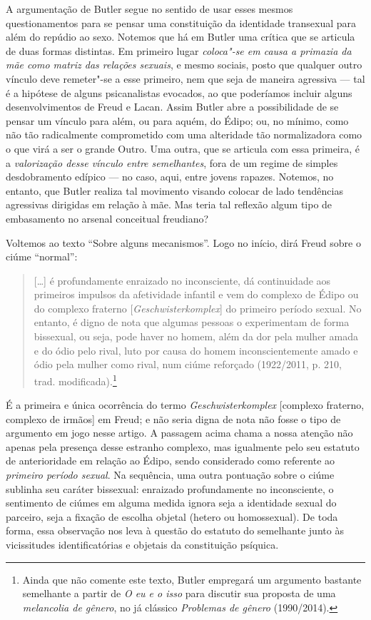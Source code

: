 A argumentação de Butler segue no sentido de usar esses mesmos
questionamentos para se pensar uma constituição da identidade transexual
para além do repúdio ao sexo. Notemos que há em Butler uma crítica que
se articula de duas formas distintas. Em primeiro lugar \emph{coloca"-se
em causa a primazia da mãe como matriz das relações sexuais}, e mesmo
sociais, posto que qualquer outro vínculo deve remeter"-se a esse
primeiro, nem que seja de maneira agressiva --- tal é a hipótese de
alguns psicanalistas evocados, ao que poderíamos incluir alguns
desenvolvimentos de Freud e Lacan. Assim Butler abre a possibilidade de
se pensar um vínculo para além, ou para aquém, do Édipo; ou, no mínimo,
como não tão radicalmente comprometido com uma alteridade tão
normalizadora como o que virá a ser o grande Outro. Uma outra, que se
articula com essa primeira, é a \emph{valorização desse vínculo entre
semelhantes}, fora de um regime de simples desdobramento edípico --- no
caso, aqui, entre jovens rapazes. Notemos, no entanto, que Butler
realiza tal movimento visando colocar de lado tendências agressivas
dirigidas em relação à mãe. Mas teria tal reflexão algum tipo de
embasamento no arsenal conceitual freudiano?

Voltemos ao texto ``Sobre alguns mecanismos''. Logo no início,
dirá Freud sobre o ciúme ``normal'':

\begin{quote}
{[}\ldots{}{]} é profundamente enraizado no inconsciente, dá continuidade aos
primeiros impulsos da afetividade infantil e vem do complexo de Édipo ou
do complexo fraterno {[}\emph{Geschwisterkomplex}{]} do primeiro período
sexual. No entanto, é digno de nota que algumas pessoas o experimentam
de forma bissexual, ou seja, pode haver no homem, além da dor pela
mulher amada e do ódio pelo rival, luto por causa do homem
inconscientemente amado e ódio pela mulher como rival, num ciúme
reforçado (1922/2011, p. 210, trad. modificada).\footnote{Ainda
  que não comente este texto, Butler empregará um argumento bastante
  semelhante a partir de \emph{O eu e o isso} para discutir sua proposta
  de uma \emph{melancolia de gênero}, no já clássico \emph{Problemas de
    gênero} (1990/2014).}
\end{quote}

É a primeira e única ocorrência do termo \emph{Geschwisterkomplex}
{[}complexo fraterno, complexo de irmãos{]} em Freud; e não seria digna
de nota não fosse o tipo de argumento em jogo nesse artigo. A passagem
acima chama a nossa atenção não apenas pela presença desse estranho
complexo, mas igualmente pelo seu estatuto de anterioridade em relação
ao Édipo, sendo considerado como referente ao \emph{primeiro período
sexual}. Na sequência, uma outra pontuação sobre o ciúme sublinha seu
caráter bissexual: enraizado profundamente no inconsciente, o sentimento
de ciúmes em alguma medida ignora seja a identidade sexual do parceiro,
seja a fixação de escolha objetal (hetero ou homossexual). De toda
forma, essa observação nos leva à questão do estatuto do semelhante
junto às vicissitudes identificatórias e objetais da constituição
psíquica.

